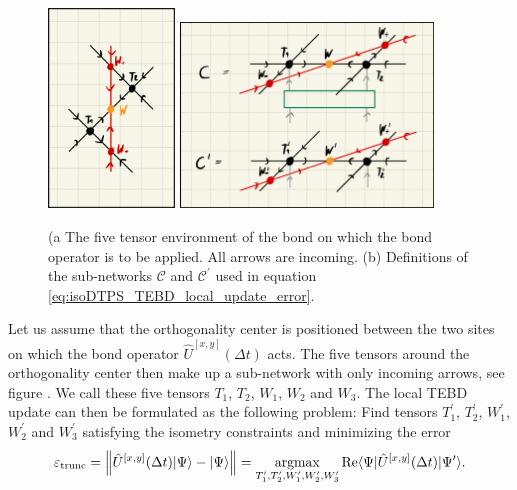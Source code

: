 \begin{figure}
	\centering
	\subcaptionbox{\label{fig:disoTPS_TEBD_five_tensor_environment}}
	{%
		\includegraphics[width=0.3\textwidth]{figures/disoTPS/disoTPS_TEBD_5_tensor_environment.jpeg}
	}
	\subcaptionbox{\label{fig:disoTPS_TEBD_contraction_definition}}
	{%
		\includegraphics[width=0.6\textwidth]{figures/disoTPS/disoTPS_TEBD_contraction_definitions.jpeg}
	}
	\caption{(a The five tensor environment of the bond on which the bond operator is to be applied. All arrows are incoming. (b) Definitions of the sub-networks $\mathcal{C}$ and $\mathcal{C}^\prime$ used in equation \eqref{eq:isoDTPS_TEBD_local_update_error}.}
	\label{fig:disoTPS_TEBD_definition_of_environment}
\end{figure}
Let us assume that the orthogonality center is positioned between the two sites on which the bond operator $\hat{U}^{[x, y]}\left(\Delta t\right)$ acts. The five tensors around the orthogonality center then make up a sub-network with only incoming arrows, see figure . We call these five tensors $T_1$, $T_2$, $W_1$, $W_2$ and $W_3$. The local TEBD update can then be formulated as the following problem: Find tensors $T_1^\prime$, $T_2^\prime$, $W_1^\prime$, $W_2^\prime$ and $W_3^\prime$ satisfying the isometry constraints and minimizing the error
\begin{equation}
	\label{eq:isoDTPS_TEBD_local_update_error}
	\varepsilon_\text{trunc} = \left\lVert \hat{U}^{[x,y]}(\Delta t)|\Psi\rangle - |\Psi\rangle\right\rVert = \underset{T_1^\prime, T_2^\prime, W_1^\prime, W_2^\prime, W_3^\prime}{\operatorname{argmax}}\operatorname{Re}\langle\Psi|\hat{U}^{[x,y]}(\Delta t)|\Psi^\prime\rangle.
\end{equation}
